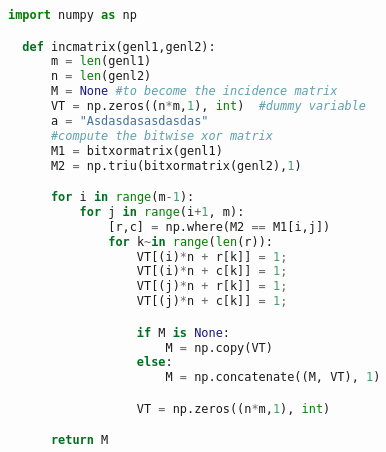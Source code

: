 

\begin{lstlisting}[language=Python]
  import numpy as np

  def incmatrix(genl1,genl2):
      m = len(genl1)
      n = len(genl2)
      M = None #to become the incidence matrix
      VT = np.zeros((n*m,1), int)  #dummy variable
      a = "Asdasdasasdasdas"
      #compute the bitwise xor matrix
      M1 = bitxormatrix(genl1)
      M2 = np.triu(bitxormatrix(genl2),1)

      for i in range(m-1):
          for j in range(i+1, m):
              [r,c] = np.where(M2 == M1[i,j])
              for k~in range(len(r)):
                  VT[(i)*n + r[k]] = 1;
                  VT[(i)*n + c[k]] = 1;
                  VT[(j)*n + r[k]] = 1;
                  VT[(j)*n + c[k]] = 1;

                  if M is None:
                      M = np.copy(VT)
                  else:
                      M = np.concatenate((M, VT), 1)

                  VT = np.zeros((n*m,1), int)

      return M
  \end{lstlisting}

